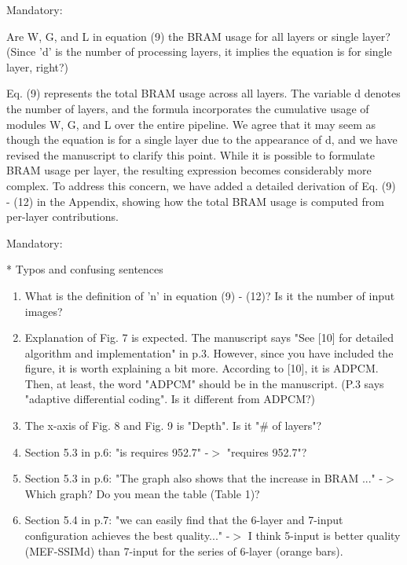 \documentclass[a4j]{jsarticle}
\begin{document}
\vspace{0.3cm}
\begin{screen}
Mandatory:

Are W, G, and L in equation (9) the BRAM usage for all layers or single layer? (Since 'd' is the number of processing layers, it implies the equation is for single layer, right?)
\end{screen}
Eq. (9) represents the total BRAM usage across all layers. 
The variable d denotes the number of layers, and the formula incorporates 
the cumulative usage of modules W, G, and L over the entire pipeline.
We agree that it may seem as though the equation is for a single layer due to the appearance of d, 
and we have revised the manuscript to clarify this point. 
While it is possible to formulate BRAM usage per layer, 
the resulting expression becomes considerably more complex.
To address this concern, we have added a detailed derivation of Eq. (9) - (12) in the Appendix, 
showing how the total BRAM usage is computed from per-layer contributions.

\vspace{0.3cm}
\begin{screen}
Mandatory:

* Typos and confusing sentences
\begin{enumerate}
\item What is the definition of 'n' in equation (9) - (12)? Is it the number of input images?

\item Explanation of Fig. 7 is expected. The manuscript says "See [10] for detailed algorithm and implementation" in p.3. However, since you have included the figure, it is worth explaining a bit more.
According to [10], it is ADPCM. Then, at least, the word "ADPCM" should be in the manuscript. (P.3 says "adaptive differential coding". Is it different from ADPCM?)

\item The x-axis of Fig. 8 and Fig. 9 is "Depth". Is it "\# of layers"?

\item Section 5.3 in p.6: "is requires 952.7" -$>$ "requires 952.7"?

\item Section 5.3 in p.6: "The graph also shows that the increase in BRAM ..." -$>$ Which graph? Do you mean the table (Table 1)?

\item Section 5.4 in p.7: "we can easily find that the 6-layer and 7-input configuration achieves the best quality..."
-$>$ I think 5-input is better quality (MEF-SSIMd) than 7-input for the series of 6-layer (orange bars).

\end{enumerate}
\end{screen}
\end{document}
